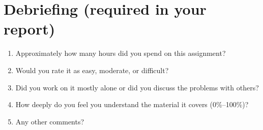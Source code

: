 \documentclass[a4paper,10pt]{article}
\begin{document}
\section{Debriefing (required in your report)}
\begin{enumerate}
    \item Approximately how many hours did you spend on this assignment?
    \item Would you rate it as easy, moderate, or difficult?
    \item Did you work on it mostly alone or did you discuss the problems with others?
    \item How deeply do you feel you understand the material it covers (0\%–100\%)?
    \item Any other comments?
\end{enumerate}
\end{document}
